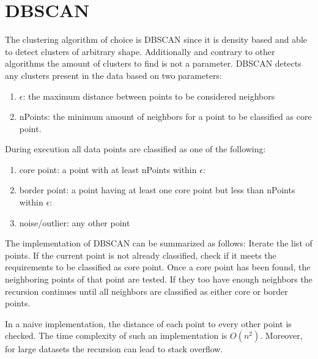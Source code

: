\documentclass[letterpaper,10pt,english]{sphinxmanual}
\begin{document}
\section{DBSCAN}
\label{\detokenize{NBodySimulation/Clustering:dbscan}}
\sphinxAtStartPar
The clustering algorithm of choice is DBSCAN since it is density based and able to detect clusters of arbitrary shape.
Additionally and contrary to other algorithms the amount of clusters to find is not a parameter. DBSCAN detects any clusters present in the data based on two parameters:
\begin{enumerate}
%
\item {} 
\sphinxAtStartPar
\(\epsilon\): the maximum distance between points to be considered neighbors

\item {} 
\sphinxAtStartPar
nPoints: the minimum amount of neighbors for a point to be classified as core point.

\end{enumerate}

\sphinxAtStartPar
During execution all data points are classified as one of the following:
\begin{enumerate}
%
\item {} 
\sphinxAtStartPar
core point: a point with at least nPoints within \(\epsilon\):

\item {} 
\sphinxAtStartPar
border point: a point having at least one core point but less than nPoints within \(\epsilon\):

\item {} 
\sphinxAtStartPar
noise/outlier: any other point

\end{enumerate}

\sphinxAtStartPar
The implementation of DBSCAN can be summarized as follows: Iterate the list of points. If the current point is not already classified, check if it meets the requirements to be classified as core point.
Once a core point has been found, the neighboring points of that point are tested. If they too have enough neighbors the recursion continues until all neighbors are classified as either core or border points.

\sphinxAtStartPar
In a naive implementation, the distance of each point to every other point is checked. The time complexity of such an implementation is \(O(n^2)\).
Moreover, for large datasets the recursion can lead to stack overflow.
\end{document}
